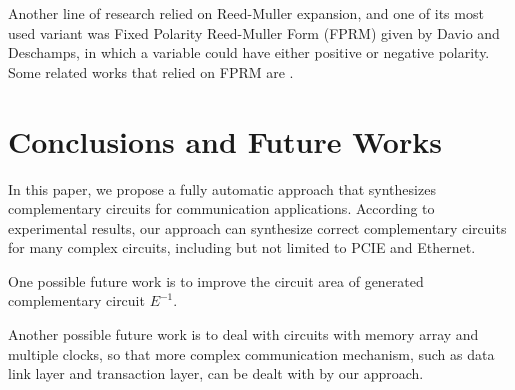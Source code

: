 \documentclass[journal]{IEEEtran}
\begin{document}
Another line of research relied on Reed-Muller expansion\cite{Reed},
and one of its most used variant was Fixed Polarity Reed-Muller Form (FPRM) given by Davio and Deschamps\cite{FPRM},
in which a variable could have either positive or negative polarity.
Some related works that relied on FPRM are \cite{fastexactFPRM,fastOFDD,lowpowerXOR}.

\section{Conclusions and Future Works}\label{sec_con}

In this paper,
we propose a fully automatic approach that synthesizes complementary circuits for communication applications.
According to experimental results,
our approach can synthesize correct complementary circuits for many complex circuits, including but not limited to PCIE and Ethernet.

One possible future work is to improve the circuit area of generated complementary circuit $E^{-1}$.

Another possible future work is to deal with circuits with memory array and multiple clocks,
so that more complex communication mechanism,
such as data link layer and transaction layer,
can be dealt with by our approach.

%
%
%
%
%
%
%
%
%
%
%


%
%
\end{document}
